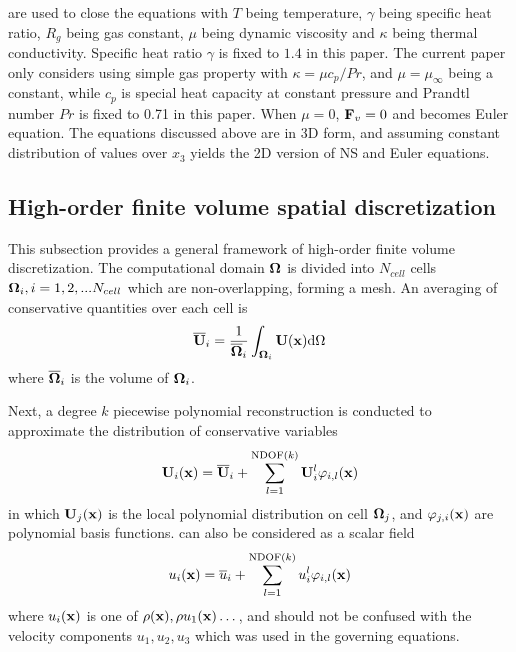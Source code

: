 are used to close the equations
with $T$ being temperature, $\gamma$ being specific heat ratio,
$R_g$ being  gas constant, $\mu$ being dynamic viscosity and
$\kappa$ being thermal conductivity.
Specific heat ratio $\gamma$ is fixed to $1.4$ in this paper.
The current paper only
considers using simple gas property
with $\kappa = \mu c_p / Pr$,
and $\mu=\mu_{\infty}$ being a constant,
while $c_p$ is special heat capacity
at constant pressure and
Prandtl number $Pr$ is fixed to 0.71 in this paper.
When $\mu=0$,
$\mathbf{F}_v=0$ and
 becomes Euler equation.
The equations discussed above are in 3D form, and
assuming constant distribution of values over $x_3$
yields the 2D version of NS and Euler equations.

\subsection{High-order finite volume spatial discretization}
\label{ssec:FV}




This subsection provides a general framework of
high-order
finite volume discretization.
The computational domain $\mathbf{\Omega}$ is divided
into $N_{cell}$ cells $\mathbf{\Omega}_i, i=1,2,...N_{cell}$ which
are non-overlapping, forming a mesh.
An averaging of conservative quantities
over each cell is
\begin{equation}
    \label{eq:FVMean}
    \overline{\mathbf{U}}_i = \frac{1}{\overline{\mathbf{\Omega}}_i}\int_{\mathbf{\Omega}_i}\mathbf{U}(\mathbf{x})\dd \Omega
\end{equation}
where $\overline{\mathbf{\Omega}}_i$ is the volume of $\mathbf{\Omega}_i$.

Next, a degree $k$ piecewise polynomial reconstruction is
conducted to approximate the distribution of
conservative variables
\begin{equation}
    \label{eq:FVRec}
    \mathbf{U}_i(\mathbf{x}) = \overline{\mathbf{U}}_i + \sum_{l=1}^{\mathrm{NDOF}(k)}{\mathbf{U}_i^l\varphi_{i,l}(\mathbf{x}) }
\end{equation}
in which $\mathbf{U}_j(\mathbf{x})$ is the local polynomial distribution on cell $\mathbf{\Omega}_{j}$,
and
$\varphi_{j,i}(\mathbf{x})$ are
polynomial basis functions.
 can also be considered as a scalar field
\begin{equation}
    \label{eq:FVRecScalar}
    u_i(\mathbf{x}) = \overline{u}_i + \sum_{l=1}^{\mathrm{NDOF}(k)}{u_i^l\varphi_{i,l}(\mathbf{x}) }
\end{equation}
where $u_i(\mathbf{x})$ is one of $\rho(\mathbf{x}), \rho u_1(\mathbf{x})\dots$, and should not
be confused with the velocity components $u_1, u_2, u_3$
which was used in the governing equations.

